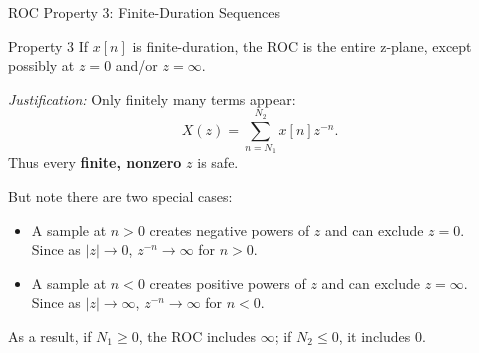 \begin{frame}[t]{ROC Property 3: Finite-Duration Sequences}
  \small
  \begin{conceptbox}{Property 3}
    If $x[n]$ is finite-duration, the ROC is the entire z-plane, except possibly at $z=0$ and/or $z=\infty$.
  \end{conceptbox}
  \vspace{0.04cm}

  \textit{Justification:} Only finitely many terms appear:
  \[
    X(z)=\sum_{n=N_1}^{N_2}x[n]z^{-n}.
  \]
  Thus every \textbf{finite, nonzero} $z$ is safe.

  But note there are two special cases:
  \begin{itemize}
    \item A sample at $n>0$ creates negative powers of $z$ and can exclude $z=0$. \\
      Since as $|z|\to 0$, $z^{-n}\to\infty$ for $n>0$.
    \item A sample at $n<0$ creates positive powers of $z$ and can exclude $z=\infty$. \\
      Since as $|z|\to\infty$, $z^{-n}\to\infty$ for $n<0$.
  \end{itemize}
  As a result, if $N_1\ge 0$, the ROC includes $\infty$; if $N_2\le 0$, it includes $0$.
\end{frame}

